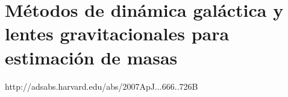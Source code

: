 \chapter{Métodos de dinámica galáctica y lentes gravitacionales para estimación de masas}

http://adsabs.harvard.edu/abs/2007ApJ...666..726B

